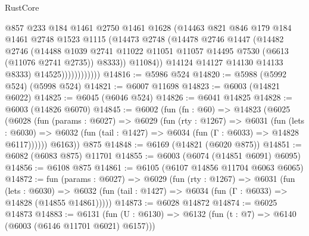 \begin{lexlean}{RustCore}
\begin{coremodule}
                            @857
                            @233
                            @184
                            @1461
                            @2750
                            @1461
                            @1628
                            (@14463
                              @821
                              @846
                              @179
                              @184
                              @1461
                              @2748
                              @1523
                              @1115
                              (@14473
                                @2748
                                (@14478
                                  @2746
                                  @1447
                                  (@14482
                                    @2746
                                    (@14488
                                      @1039
                                      @2741
                                      @11022
                                      @11051
                                      @11057
                                      @14495
                                      @7530
                                      (@6613 (@11076 @2741 @2735))
                                      @8333))
                                  @11084))
                              @14124
                              @14127
                              @14130
                              @14133
                              @8333)
                            @14525))))))))))))
@14816 := @5986 @524
@14820 := @5988 (@5992 @524) (@5998 @524)
@14821 := @6007 @11698
@14823 := @6003 (@14821 @6022)
@14825 := @6045 (@6046 @524)
@14826 := @6041 @14825
@14828 := @6003 (@14826 @6070)
@14845 := @6002
    (fun (fn : @60) =>
    @14823
      (@6025
        (@6028
          (fun (params : @6027) =>
          @6029
            (fun (rty : @1267) =>
            @6031
              (fun (lets : @6030) =>
              @6032 (fun (tail : @1427) => @6034 (fun (Γ : @6033) => @14828 @6117))))))
        @6163))
    @875
@14848 := @6169 (@14821 (@6020 @875))
@14851 := @6082 (@6083 @875) @11701
@14855 := @6003 (@6074 (@14851 @6091) @6095)
@14856 := @6108 @875
@14861 := @6105 (@6107 @14856 @11704 @6063 @6065)
@14872 := fun (params : @6027) =>
  @6029
    (fun (rty : @1267) =>
    @6031
      (fun (lets : @6030) =>
      @6032 (fun (tail : @1427) => @6034 (fun (Γ : @6033) => @14828 (@14855 @14861)))))
@14873 := @6028 @14872
@14874 := @6025 @14873
@14883 := @6131
    (fun (U : @6130) => @6132 (fun (t : @7) => @6140 (@6003 (@6146 @11701 @6021) @6157)))

\end{coremodule}
\end{lexlean}
